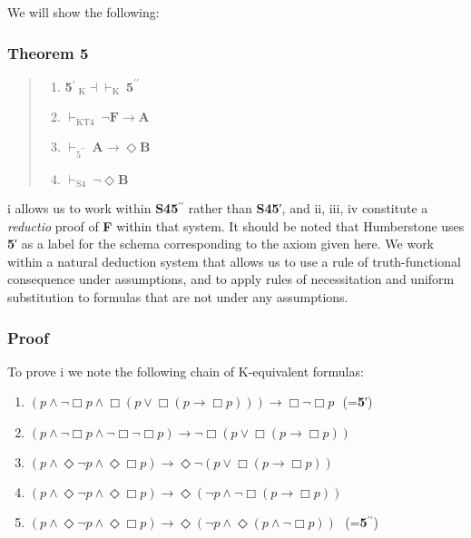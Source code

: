 \documentclass[
  11pt,
  letterpaper,
  DIV=11,
  numbers=noendperiod,
  twoside]{scrartcl}
\providecommand{\tightlist}{%
  \setlength{\itemsep}{0pt}\setlength{\parskip}{0pt}}
\begin{document}
We will show the following:

\subsubsection*{Theorem 5}\label{theorem-5}

\begin{quote}
\begin{enumerate}
\def\labelenumi{\roman{enumi}.}
\tightlist
\item
  \textbf{5}\(^{\prime}~_{\text{K}}\!{\dashv}{\vdash}_\text{K}~\textbf{5}^{\prime\prime}\)
\item
  \(\vdash_\text{KT4} ~ \neg \textbf{F}\rightarrow \textbf{A}\)
\item
  \(\vdash_{\text{5}^{\prime\prime}} ~\textbf{A}\rightarrow \Diamond\textbf{B}\)
\item
  \(\vdash_\text{S4} ~\neg \Diamond\textbf{B}\)
\end{enumerate}
\end{quote}

i allows us to work within \textbf{S45}\(^{\prime\prime}\) rather than
\textbf{S45}′, and ii, iii, iv constitute a \emph{reductio} proof of
\textbf{F} within that system. It should be noted that Humberstone uses
\textbf{5}′ as a label for the schema corresponding to the axiom given
here. We work within a natural deduction system that allows us to use a
rule of truth-functional consequence under assumptions, and to apply
rules of necessitation and uniform substitution to formulas that are not
under any assumptions.

\subsubsection*{Proof}\label{proof-5}

To prove i we note the following chain of K-equivalent formulas:

\begin{enumerate}
\def\labelenumi{\arabic{enumi}.}
\tightlist
\item
  \((p \wedge \neg \Box p \wedge \Box (p \vee \Box (p \rightarrow \Box p))) \rightarrow \Box \neg \Box p~~~\)(=\textbf{5}′)
\item
  \((p \wedge \neg \Box p \wedge \neg \Box \neg \Box p) \rightarrow \neg \Box (p \vee \Box (p \rightarrow \Box p))\)
\item
  \((p \wedge \Diamond\neg p \wedge \Diamond\Box p) \rightarrow \Diamond\neg (p \vee \Box (p \rightarrow \Box p))\)
\item
  \((p \wedge \Diamond\neg p \wedge \Diamond\Box p) \rightarrow \Diamond(\neg p \wedge \neg \Box (p \rightarrow \Box p))\)
\item
  \((p \wedge \Diamond\neg p \wedge \Diamond\Box p) \rightarrow \Diamond(\neg p \wedge \Diamond(p \wedge \neg \Box p))~~~\)(=\textbf{5}\(^{\prime\prime}\))
\end{enumerate}
\end{document}
